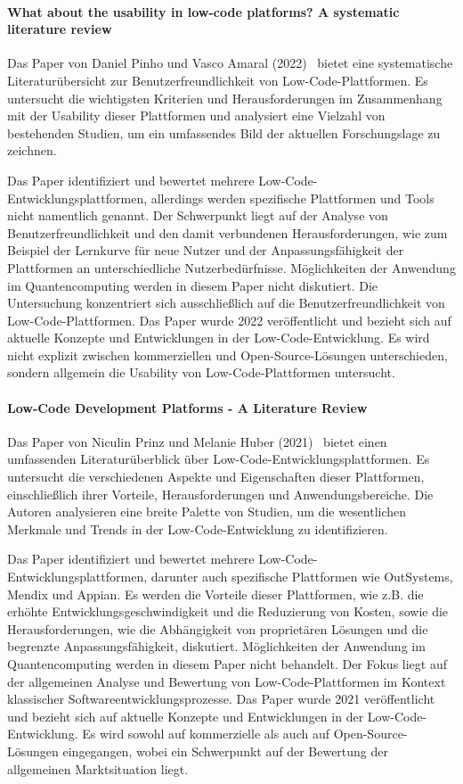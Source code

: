 \paragraph{What about the usability in low-code platforms? A systematic literature review}

Das Paper von Daniel Pinho und Vasco Amaral (2022)~\cite{Pinho_2022} bietet eine systematische Literaturübersicht zur Benutzerfreundlichkeit von 
Low-Code-Plattformen. Es untersucht die wichtigsten Kriterien und Herausforderungen im Zusammenhang mit der Usability 
dieser Plattformen und analysiert eine Vielzahl von bestehenden Studien, um ein umfassendes Bild der aktuellen Forschungslage zu zeichnen.

Das Paper identifiziert und bewertet mehrere Low-Code-Entwicklungsplattformen, allerdings werden spezifische Plattformen 
und Tools nicht namentlich genannt. Der Schwerpunkt liegt auf der Analyse von Benutzerfreundlichkeit und den damit 
verbundenen Herausforderungen, wie zum Beispiel der Lernkurve für neue Nutzer und der Anpassungsfähigkeit der 
Plattformen an unterschiedliche Nutzerbedürfnisse. 
Möglichkeiten der Anwendung im Quantencomputing werden in diesem Paper nicht diskutiert. 
Die Untersuchung konzentriert sich ausschließlich auf die Benutzerfreundlichkeit von Low-Code-Plattformen. 
Das Paper wurde 2022 veröffentlicht und bezieht sich auf aktuelle Konzepte und Entwicklungen in der Low-Code-Entwicklung. 
Es wird nicht explizit zwischen kommerziellen und Open-Source-Lösungen unterschieden, 
sondern allgemein die Usability von Low-Code-Plattformen untersucht.

\paragraph{Low-Code Development Platforms - A Literature Review}

Das Paper von Niculin Prinz und Melanie Huber (2021)~\cite{Prinz_2021} bietet einen umfassenden Literaturüberblick über Low-Code-Entwicklungsplattformen. 
Es untersucht die verschiedenen Aspekte und Eigenschaften dieser Plattformen, einschließlich ihrer Vorteile, Herausforderungen 
und Anwendungsbereiche. Die Autoren analysieren eine breite Palette von Studien, um die wesentlichen Merkmale und Trends 
in der Low-Code-Entwicklung zu identifizieren.

Das Paper identifiziert und bewertet mehrere Low-Code-Entwicklungsplattformen, darunter auch spezifische Plattformen wie 
OutSystems, Mendix und Appian. Es werden die Vorteile dieser Plattformen, wie z.B. die erhöhte Entwicklungsgeschwindigkeit und 
die Reduzierung von Kosten, sowie die Herausforderungen, wie die Abhängigkeit von proprietären Lösungen und die begrenzte 
Anpassungsfähigkeit, diskutiert. Möglichkeiten der Anwendung im Quantencomputing werden in diesem Paper nicht behandelt. 
Der Fokus liegt auf der allgemeinen Analyse und Bewertung von Low-Code-Plattformen im Kontext 
klassischer Softwareentwicklungsprozesse. Das Paper wurde 2021 veröffentlicht und 
bezieht sich auf aktuelle Konzepte und Entwicklungen in der Low-Code-Entwicklung. Es wird sowohl auf kommerzielle als 
auch auf Open-Source-Lösungen eingegangen, wobei ein Schwerpunkt auf der Bewertung der allgemeinen Marktsituation liegt.

